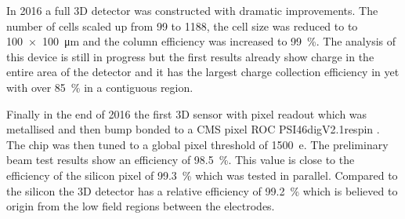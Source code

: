 In 2016 a full 3D detector was constructed with dramatic improvements. The number of cells scaled up from 99 to 1188, the cell size was reduced to to \SI{100x100}{\micro\meter} and the column efficiency was increased to \SI{99}{\%}. The analysis of this device is still in progress but the first results already show charge in the entire area of the detector and it has the largest charge collection efficiency in \pcvd yet with over \SI{85}{\%} in a contiguous region.\par
Finally in the end of 2016 the first \pcvd 3D sensor with pixel readout which was metallised and then bump bonded to a CMS pixel \ac{ROC} PSI46digV2.1respin \cite{kornmayer}. The chip was then tuned to a global pixel threshold of \SI{1500}{e}. The preliminary beam test results show an efficiency of \SI{98.5}{\%}. This value is close to the efficiency of the silicon pixel of \SI{99.3}{\%} which was tested in parallel. Compared to the silicon the 3D detector has a relative efficiency of \SI{99.2}{\%} which is believed to origin from the low field regions between the electrodes.